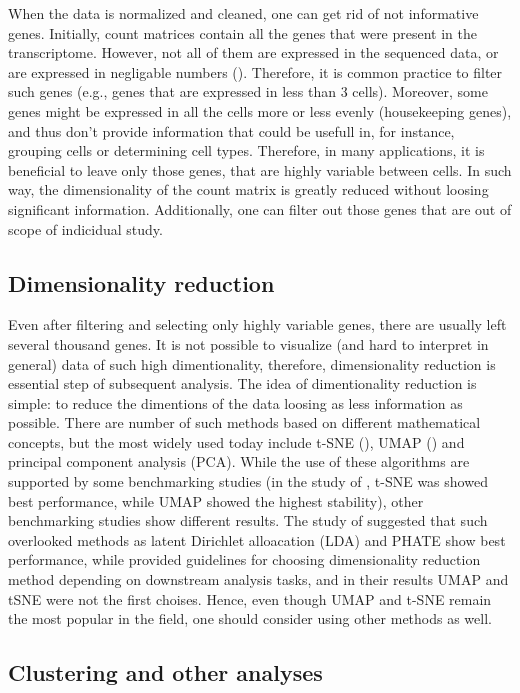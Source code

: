When the data is normalized and cleaned, one can get rid of not informative genes.
Initially, count matrices contain all the genes that were present in the transcriptome.
However, not all of them are expressed in the sequenced data, or are expressed in negligable numbers (\cite{Heumos2023}).
Therefore, it is common practice to filter such genes (e.g., genes that are expressed in less than 3 cells).
Moreover, some genes might be expressed in all the cells more or less evenly (housekeeping genes),
and thus don't provide information that could be usefull in, for instance, grouping cells or determining cell types.
Therefore, in many applications, it is beneficial to leave only those genes, that are highly variable between cells.
In such way, the dimensionality of the count matrix is greatly reduced without loosing significant information.
Additionally, one can filter out those genes that are out of scope of indicidual study.

\subsection{Dimensionality reduction}

Even after filtering and selecting only highly variable genes, there are usually left several thousand genes.
It is not possible to visualize (and hard to interpret in general) data of such high dimentionality, therefore,
dimensionality reduction is essential step of subsequent analysis.
The idea of dimentionality reduction is simple:
to reduce the dimentions of the data loosing as less information as possible.
There are number of such methods based on different mathematical concepts, but the most widely used today include
t-SNE (\cite{Hinton2002}), UMAP (\cite{McInnes2018}) and principal component analysis (PCA).
While the use of these algorithms are supported by some benchmarking studies
(in the study of \cite{Xiang2021}, t-SNE was showed best performance, while UMAP showed the highest stability),
other benchmarking studies show different results.
The study of \cite{Koch2021} suggested that such overlooked methods as
latent Dirichlet alloacation (LDA) and PHATE show best performance,
while \cite{Sun2019} provided guidelines for choosing dimensionality reduction method
depending on downstream analysis tasks, and in their results UMAP and tSNE were not the first choises.
Hence, even though UMAP and t-SNE remain the most popular in the field, one should consider using other methods as well.

\subsection{Clustering and other analyses}

